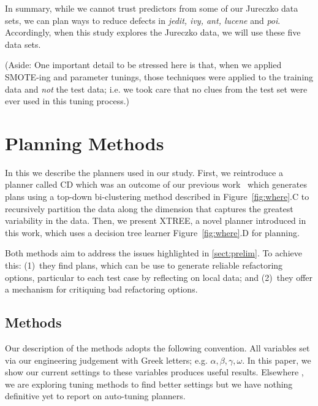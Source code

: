 \documentclass{sig-alternate}
\newcommand{\tion}[1]{\textsection\ref{sect:#1}}
\newcommand{\fig}[1]{Figure~\ref{fig:#1}}
\begin{document}
In summary, while we cannot trust predictors from some of our Jureczko data sets,
we can plan ways to reduce defects in {\em jedit, ivy, ant, lucene} and {\em poi}.
Accordingly, when this study explores the Jureczko data, we will use these five data sets.

(Aside: One important detail to be stressed here is that, when we applied    SMOTE-ing and
parameter tunings, those techniques were applied to the training data and {\em not}
the test data; i.e. we took care that no clues from the test set were ever used in this tuning process.)


  
\section{Planning Methods}\label{sect:planners}
 
In this we describe the planners used in our study. First, we reintroduce a planner called CD which was an outcome of our previous work~\cite{me12c} which generates plans using a top-down bi-clustering method described in \fig{where}.C to recursively partition the data along the dimension that captures the greatest variability in the data. Then, we present XTREE, a novel planner introduced in this work, which uses a decision tree learner \fig{where}.D for planning.


Both methods aim to address the issues highlighted in \tion{prelim}. To achieve this: (1)~they find plans, which can be use to generate reliable refactoring options, particular to each test case by reflecting on local data; and (2)~they offer a mechanism for critiquing bad refactoring options.


\subsection{  Methods}

Our  description of the methods adopts the following convention. All variables set via  our engineering judgement  with Greek letters; e.g. $\alpha,\beta,\gamma,\omega$. In this paper, we show our current settings to these variables produces useful results. Elsewhere \cite{krall14,fu:ase15}, we are exploring tuning methods to find better settings but  we have nothing definitive yet to report on auto-tuning planners.
\end{document}
